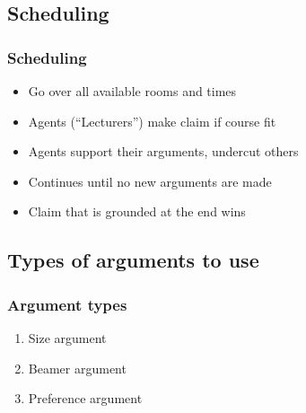\documentclass{beamer}
\begin{document}
\subsection{Scheduling}
\begin{frame}
	\frametitle{Scheduling}
        \begin{itemize}
            \item Go over all available rooms and times
            \item Agents (``Lecturers'') make claim if course fit
            \item Agents support their arguments, undercut others
            \item Continues until no new arguments are made
            \item Claim that is grounded at the end wins
        \end{itemize}
\end{frame}

\subsection{Types of arguments to use}
\begin{frame}
	\frametitle{Argument types}
	\begin{enumerate}
		\item Size argument 
		\item Beamer argument
		\item Preference argument
	\end{enumerate}
\end{frame}
\end{document}
